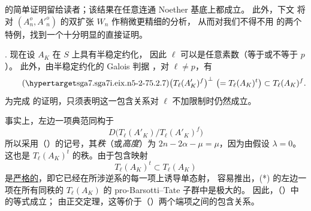  的简单证明留给读者；该结果在任意连通 Noether 基底上都成立。
此外，下文  将对 $(A_n^o,{A'}_n^o)$ 的双扩张 $W_n$ 作稍微更精细的分析，
从而对我们不得不用  的两个特例，找到一个十分明显的直接证明。

\smallskip
\noindent
{}. 现在设 $A_K$ 在 $S$ 上具有半稳定约化，
因此 $\ell$ 可以是任意素数（等于或不等于 $p$）。
此外，由半稳定约化的 Galois 判据 ，对 $\ell\neq p$，有
\begin{equation}\tag{\SGARefTarget{sga7.sga7i.eix.n5-2-7}{5.2.7}}
 \bigl(T_\ell(A'_K)^f\bigr)^\perp
 \ \bigl(=T_\ell(A_K)^t\bigr)
 \subset T_\ell(A_K)^f.
\end{equation}
为完成  的证明，只须表明这一包含关系对 $\ell$ 不加限制时仍然成立。

事实上，左边一项典范同构于
\[
 D\bigl(T_\ell(A'_K)/T_\ell(A'_K)^f\bigr)
\]
所以采用（）的记号，其\emph{秩}（或\emph{高度}）为
$2n-2\alpha-\mu=\mu$，因为由假设 $\lambda=0$。
这也是 $T_\ell(A_K)^t$ 的秩。由于包含映射
\begin{equation}\tag{*}
 T_\ell(A_K)^t\subset T_\ell(A_K)
\end{equation}
是\underline{严格的}，即它已经在所涉逆系的每一项上诱导单态射，
容易推出，(*) 的左边一项在所有同秩的 $T_\ell(A_K)$ 的 pro-Barsotti--Tate 子群中是极大的。
因此，（）中的等式成立；
由正交定理，这等价于（）两个端项之间的包含关系。



%

